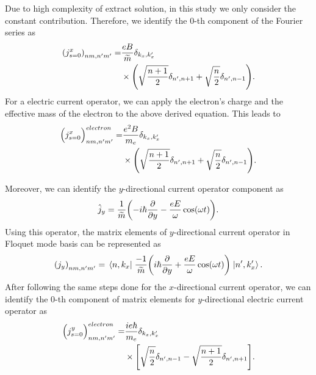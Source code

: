 Due to high complexity of extract solution, in this study we only consider the constant contribution. Therefore, we identify the $0$-th component of the Fourier series as
\begin{equation} \label{eq_d10}
  \begin{aligned}
      \qty({j}^x_{s=0})_{nm,n'm'} =&
      \frac{eB}{{\widetilde{m}}}
      \delta_{k_x,k'_x} \\
      & \times
      \qty(\sqrt{\frac{n+1}{2}} \delta_{n',n+1} + \sqrt{\frac{n}{2}}
      \delta_{n',n-1}).
  \end{aligned}
\end{equation}
For a electric current operator, we can apply the electron's charge and the  effective mass of the electron to the above derived equation. This leads to
\begin{equation} \label{eq_d11}
  \begin{aligned}
      \Big({j}^x_{s=0}\Big)_{nm,n'm'}^{electron} =&
      \frac{e^2B}{{m_e}}
      \delta_{k_x,k'_x}\\
      & \times
      \qty(\sqrt{\frac{n+1}{2}} \delta_{n',n+1} + \sqrt{\frac{n}{2}}
      \delta_{n',n-1}).
  \end{aligned}
\end{equation}

Moreover, we can identify the $y$-directional current operator component as
\begin{equation} \label{eq_d12}
  \hat{j}_y = \frac{1}{\widetilde{m}} \qty(-i\hbar\pdv{y} - \frac{eE}{\omega}\cos(\omega t)).
\end{equation}
Using this operator, the matrix elements of $y$-directional current operator in Floquet mode basis can be represented as
\begin{equation} \label{eq_d13}
  \qty({j}_y)_{nm,n'm'} =
  \mel{n,k_x}{\;\frac{-1}{\widetilde{m}} \qty(i\hbar\pdv{y} + \frac{eE}{\omega}\cos(\omega t))\;}{n',k'_x}.
\end{equation}
After following the same steps done for the $x$-directional current operator, we can identify the $0$-th component of matrix elements for $y$-directional electric current operator as
\begin{equation} \label{eq_d14}
  \begin{aligned}
    \Big({j}^y_{s=0}\Big)_{nm,n'm'}^{electron} = &
    \frac{ie\hbar}{{m_e}}
    \delta_{k_x,k'_x} \\
    & \times
    \qty[
    \sqrt{\frac{n}{2}} \delta_{n',n-1}
    - \sqrt{\frac{n+1}{2}} \delta_{n',n+1}
    ].
  \end{aligned}
\end{equation}
